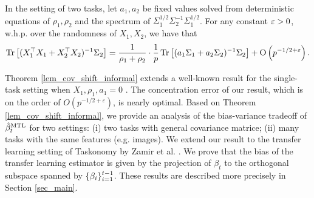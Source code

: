 \begin{theorem}[Informal]\label{lem_cov_shift_informal}
	In the setting of two tasks, let $a_1, a_2$ be fixed values solved from deterministic equations of $\rho_1, \rho_2$ and the spectrum of $\Sigma_1^{1/2}\Sigma_2^{-1}\Sigma_1^{1/2}$.
	For any constant ${\varepsilon}>0$, w.h.p. over the randomness of $X_1, X_2$, we have that
	\begin{align}\label{eq_introX1X2}
		\operatorname{Tr}\left[(X_1^{\top}X_1 + X_2^{\top}X_2)^{-1}\Sigma_2\right] = \frac{1}{\rho_1+\rho_2}\cdot \frac1p\operatorname{Tr}\left[ (a_1 \Sigma_1 + a_2\Sigma_2)^{-1} \Sigma_2\right] +\operatorname{O}\left({p^{-1/2+\varepsilon}}\right).
	\end{align}
\end{theorem}

Theorem \ref{lem_cov_shift_informal} extends a well-known result for the single-task setting when $X_1, \rho_1, a_1 = 0$ \cite{S07}.
The concentration error of our result, which is on the order of $O(p^{-1/2+\varepsilon})$, is nearly optimal.
Based on Theorem \ref{lem_cov_shift_informal}, we provide an analysis of the bias-variance tradeoff of $\hat{\beta}_t^{\text{MTL}}$ for two settings:
(i) two tasks with general covariance matrice; (ii) many tasks with the same features (e.g. images).
We extend our result to the transfer learning
setting of Taskonomy by Zamir et al. \cite{ZSSGM18}.
We prove that the bias of the transfer learning estimator is given by the projection of $\beta_t$ to the orthogonal subspace spanned by $\{\beta_i\}_{i=1}^{t-1}$.
These results are described more precisely in Section \ref{sec_main}.

